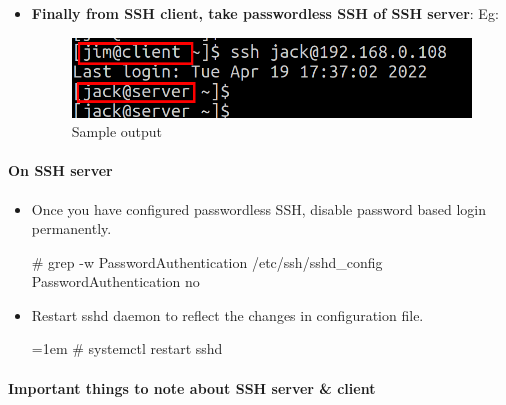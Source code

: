 \begin{flushleft}
\begin{itemize}
\begin{itemize}
		\end{itemize}			
	\newpage
	
	\item \textbf{Finally from SSH client, take passwordless SSH of SSH server}:
		Eg:
	\begin{figure}[h!]
		\centering
		\includegraphics[scale=0.4]{content/chapter19/images/ssh07.png}
		\caption{Sample output}
		\label{fig:stage55693}
	\end{figure}
	
\end{itemize}		

\paragraph{On SSH server}

\begin{itemize}
	\item 	Once you have configured passwordless SSH, disable password based login permanently.
	
	\begin{tcolorbox}[breakable,notitle,boxrule=-0pt,colback=black,colframe=black]
		\color{green}
		\# grep  -w  PasswordAuthentication   /etc/ssh/sshd\_config 
		\newline
		\color{white}
		PasswordAuthentication no
		\font=4pt
	\end{tcolorbox}
	\item 	Restart sshd daemon to reflect the changes in configuration file.
	
	\bigskip
	\begin{tcolorbox}[breakable,notitle,boxrule=-0pt,colback=black,colframe=black]
		\color{green}
		\font=1em
		\# systemctl restart sshd
		\font=4pt
	\end{tcolorbox}
	
\end{itemize}

	
	
	
	
	
	\newpage
	\paragraph{Important things to note about SSH server \& client}
	

\end{flushleft}
